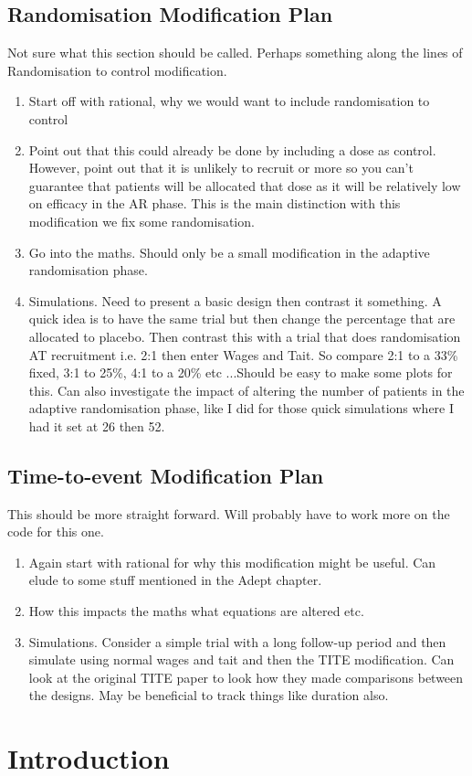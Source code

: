 
\subsection{Randomisation Modification Plan}
Not sure what this section should be called. Perhaps something along the lines of Randomisation to control modification. 

\begin{enumerate}
	\item Start off with rational, why we would want to include randomisation to control 
	\item Point out that this could already be done by including a dose as control. However, point out that it is unlikely to recruit or more so you can't guarantee that patients will be allocated that dose as it will be relatively low on efficacy in the AR phase. This is the main distinction with this modification we fix some randomisation. 
	\item Go into the maths. Should only be a small modification in the adaptive randomisation phase. 
	\item Simulations. Need to present a basic design then contrast it something. A quick idea is to have the same trial but then change the percentage that are allocated to placebo. Then contrast this with a trial that does randomisation AT recruitment i.e. 2:1 then enter Wages and Tait. So compare 2:1 to a 33\% fixed, 3:1 to 25\%, 4:1 to a 20\% etc ...Should be easy to make some plots for this. Can also investigate the impact of altering the number of patients in the adaptive randomisation phase, like I did for those quick simulations where I had it set at 26 then 52. 
\end{enumerate}



\subsection{Time-to-event Modification Plan}
This should be more straight forward. Will probably have to work more on the code for this one. 

\begin{enumerate}
	\item Again start with rational for why this modification might be useful. Can elude to some stuff mentioned in the Adept chapter. 
	\item How this impacts the maths what equations are altered etc. 
	\item Simulations. Consider a simple trial with a long follow-up period and then simulate using normal wages and tait and then the TITE modification. Can look at the original TITE paper to look how they made comparisons between the designs. May be beneficial to track things like duration also. 
\end{enumerate}



\section{Introduction}

